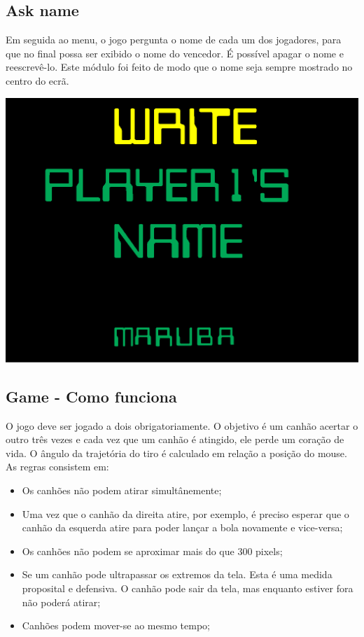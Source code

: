 \documentclass[12pt]{article}
\begin{document}
\subsection{Ask name}
Em seguida ao menu, o jogo pergunta o nome de cada um dos jogadores, para que no final possa
ser exibido o nome do vencedor. É possível apagar o nome e reescrevê-lo. Este módulo foi feito de modo que
o nome seja sempre mostrado no centro do ecrã. 
\begin{center}
    \includegraphics[width = 14cm]{askname.png}
\end{center}
\newpage
\subsection{Game - Como funciona}
O jogo deve ser jogado a dois obrigatoriamente. O objetivo é um canhão acertar o outro três vezes e cada vez que um canhão é atingido, ele perde um coração de vida. O ângulo da trajetória do tiro é calculado em relação a posição do mouse.
As regras consistem em:
\begin{itemize}
    \item Os canhões não podem atirar simultânemente;
    \item Uma vez que o canhão da direita atire, por exemplo, é preciso esperar que o canhão da esquerda atire para poder lançar a bola novamente e vice-versa;
    \item Os canhões não podem se aproximar mais do que 300 pixels;
    \item Se um canhão pode ultrapassar os extremos da tela. Esta é uma medida proposital e defensiva. O canhão pode sair da tela, mas enquanto estiver fora não poderá atirar;
    \item Canhões podem mover-se ao mesmo tempo;
\end{itemize}
\end{document}
